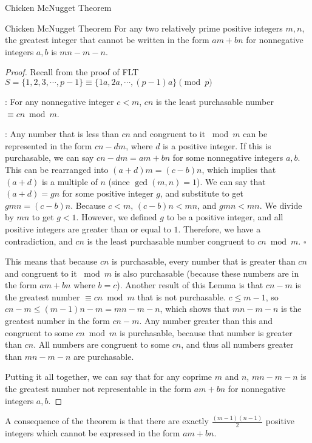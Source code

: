 \begin{mysubsection}{Chicken McNugget Theorem}
    \begin{theorem}[thm:]{Chicken McNugget Theorem}
        For any two relatively prime positive integers $m,n$, the greatest integer that cannot be written in the form $am + bn$ for nonnegative integers $a, b$ is $mn-m-n$. 
    \end{theorem}

    \begin{proof}
        Recall from the proof of FLT $S = \{1,2,3,\cdots, p-1\}\equiv \{1a, 2a, \cdots, (p-1)a\} \pmod{p}$

        : For any nonnegative integer $c < m$, $cn$ is the least purchasable number $\equiv cn \bmod m$.

        : Any number that is less than $cn$ and congruent to it $\bmod m$ can be represented in the form $cn-dm$, where $d$ is a positive integer. If this is purchasable, we can say $cn-dm=am+bn$ for some nonnegative integers $a, b$. This can be rearranged into $(a+d)m=(c-b)n$, which implies that $(a+d)$ is a multiple of $n$ (since $\gcd(m, n)=1$). We can say that $(a+d)=gn$ for some positive integer $g$, and substitute to get $gmn=(c-b)n$. Because $c < m$, $(c-b)n < mn$, and $gmn < mn$. We divide by $mn$ to get $g<1$. However, we defined $g$ to be a positive integer, and all positive integers are greater than or equal to $1$. Therefore, we have a contradiction, and $cn$ is the least purchasable number congruent to $cn \bmod m$. $\square$

        This means that because $cn$ is purchasable, every number that is greater than $cn$ and congruent to it $\bmod m$ is also purchasable (because these numbers are in the form $am+bn$ where $b=c$). Another result of this Lemma is that $cn-m$ is the greatest number $\equiv cn \bmod m$ that is not purchasable. $c \leq m-1$, so $cn-m \leq (m-1)n-m=mn-m-n$, which shows that $mn-m-n$ is the greatest number in the form $cn-m$. Any number greater than this and congruent to some $cn \bmod m$ is purchasable, because that number is greater than $cn$. All numbers are congruent to some $cn$, and thus all numbers greater than $mn-m-n$ are purchasable.

        Putting it all together, we can say that for any coprime $m$ and $n$, $mn-m-n$ is the greatest number not representable in the form $am + bn$ for nonnegative integers $a, b$. 
    \end{proof}

    \mynewpage
    \begin{corollary}[crl:]{}
        A consequence of the theorem is that there are exactly $\frac{(m - 1)(n - 1)}{2}$ positive integers which cannot be expressed in the form $am + bn$. 
    \end{corollary}


\end{mysubsection}
